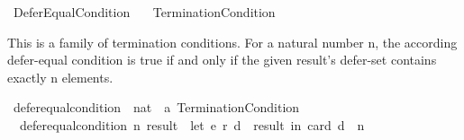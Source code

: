 %
\begin{isabellebody}%
%
%
\isadelimdocument
\isanewline
%
\endisadelimdocument
%
\isatagdocument
\isanewline
\isanewline
%
\isamarkuptrue%
%
\endisatagdocument
{\isafolddocument}%
%
\isadelimdocument
%
\endisadelimdocument
%
\isadelimtheory
%
\endisadelimtheory
%
\isatagtheory
{}\isamarkupfalse%
\ Defer{\isacharunderscore}{\kern0pt}Equal{\isacharunderscore}{\kern0pt}Condition\isanewline
\ \ \ Termination{\isacharunderscore}{\kern0pt}Condition\isanewline
{}%
\endisatagtheory
{\isafoldtheory}%
%
\isadelimtheory
%
\endisadelimtheory
%
\begin{isamarkuptext}%
This is a family of termination conditions. For a natural number n,
the according defer-equal condition is true if and only if the given
result's defer-set contains exactly n elements.%
\end{isamarkuptext}\isamarkuptrue%
%
\isadelimdocument
%
\endisadelimdocument
%
\isatagdocument
%
\isamarkuptrue%
%
\endisatagdocument
{\isafolddocument}%
%
\isadelimdocument
%
\endisadelimdocument
{}\isamarkupfalse%
\ defer{\isacharunderscore}{\kern0pt}equal{\isacharunderscore}{\kern0pt}condition\ {\isacharcolon}{\kern0pt}{\isacharcolon}{\kern0pt}\ {\isachardoublequoteopen}nat\ {\isasymRightarrow}\ {\isacharprime}{\kern0pt}a\ Termination{\isacharunderscore}{\kern0pt}Condition{\isachardoublequoteclose}\ \isanewline
\ \ {\isachardoublequoteopen}defer{\isacharunderscore}{\kern0pt}equal{\isacharunderscore}{\kern0pt}condition\ n\ result\ {\isacharequal}{\kern0pt}\ {\isacharparenleft}{\kern0pt}let\ {\isacharparenleft}{\kern0pt}e{\isacharcomma}{\kern0pt}\ r{\isacharcomma}{\kern0pt}\ d{\isacharparenright}{\kern0pt}\ {\isacharequal}{\kern0pt}\ result\ in\ card\ d\ {\isacharequal}{\kern0pt}\ n{\isacharparenright}{\kern0pt}{\isachardoublequoteclose}\isanewline
%
\isadelimtheory
\isanewline
%
\endisadelimtheory
%
\isatagtheory
{}\isamarkupfalse%
%
\endisatagtheory
{\isafoldtheory}%
%
\isadelimtheory
%
\endisadelimtheory
%
\end{isabellebody}%
\endinput
